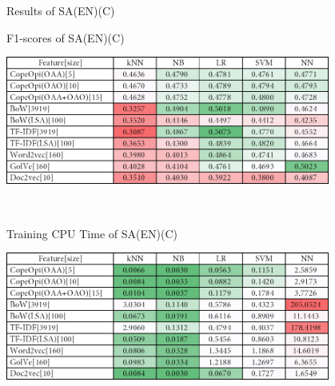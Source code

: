 \caption{Results of SA(EN)(C)}
\label{tab:sa_en_c}
\centering
\begin{subtable}{\textwidth}
	\centering
	\caption{F1-scores of SA(EN)(C)}
	\includegraphics[width=0.8\textwidth]{./figure/01A3.png}
\end{subtable}\\[1em]
\begin{subtable}{\textwidth}
	\centering
	\caption{Training CPU Time of SA(EN)(C)}
	\includegraphics[width=0.8\textwidth]{./figure/01A3t.png}
\end{subtable}
